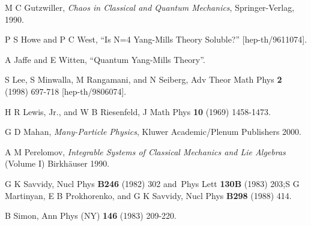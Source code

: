 \documentclass[a4paper,12pt]{article}%
\begin{document}
\begin{thebibliography}{9}
M C Gutzwiller, \textit{Chaos in Classical and Quantum
Mechanics}, Springer-Verlag, 1990.

P S Howe and P C West, ``Is N=4 Yang-Mills Theory Soluble?'' [hep-th/9611074].

A Jaffe and E Witten, ``Quantum Yang-Mills Theory''.

S Lee, S Minwalla, M Rangamani, and N Seiberg, Adv Theor Math
Phys \textbf{2} (1998) 697-718 [hep-th/9806074].

H R Lewis, Jr., and W B Riesenfeld, J Math Phys \textbf{10}
(1969) 1458-1473.

G D Mahan, \textit{Many-Particle Physics}, Kluwer
Academic/Plenum Publishers 2000.

A M Perelomov, \textit{Integrable Systems of Classical
Mechanics and Lie Algebras} (Volume I) Birkh\"{a}user 1990.

G K Savvidy, Nucl Phys \textbf{B246} (1982) 302 and\ Phys
Lett \textbf{130B} (1983) 203;\newline S G Martinyan, E B Prokhorenko, and G K
Savvidy, Nucl Phys \textbf{B298} (1988) 414.

B Simon, Ann Phys (NY) \textbf{146 }(1983) 209-220.
\end{thebibliography}
\end{document}
